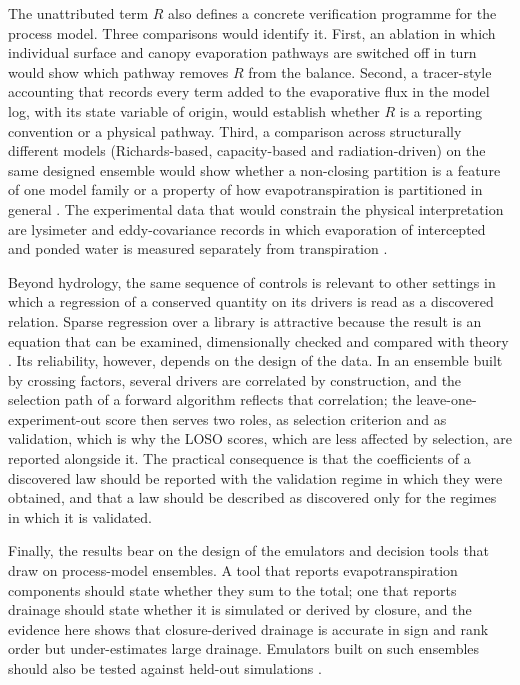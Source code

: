 \documentclass[preprint,12pt,authoryear]{elsarticle}
\begin{document}
The unattributed term $R$ also defines a concrete verification programme for the process model. Three comparisons would identify it. First, an ablation in which individual surface and canopy evaporation pathways are switched off in turn would show which pathway removes $R$ from the balance. Second, a tracer-style accounting that records every term added to the evaporative flux in the model log, with its state variable of origin, would establish whether $R$ is a reporting convention or a physical pathway. Third, a comparison across structurally different models (Richards-based, capacity-based and radiation-driven) on the same designed ensemble would show whether a non-closing partition is a feature of one model family or a property of how evapotranspiration is partitioned in general \citep{Simunek2008,Jones2003,Keating2003,Steduto2009}. The experimental data that would constrain the physical interpretation are lysimeter and eddy-covariance records in which evaporation of intercepted and ponded water is measured separately from transpiration \citep{Good2015,Jasechko2013,Schlesinger2014}.

Beyond hydrology, the same sequence of controls is relevant to other settings in which a regression of a conserved quantity on its drivers is read as a discovered relation. Sparse regression over a library is attractive because the result is an equation that can be examined, dimensionally checked and compared with theory \citep{Brunton2016,Udrescu2020,Champion2019}. Its reliability, however, depends on the design of the data. In an ensemble built by crossing factors, several drivers are correlated by construction, and the selection path of a forward algorithm reflects that correlation; the leave-one-experiment-out score then serves two roles, as selection criterion and as validation, which is why the LOSO scores, which are less affected by selection, are reported alongside it. The practical consequence is that the coefficients of a discovered law should be reported with the validation regime in which they were obtained, and that a law should be described as discovered only for the regimes in which it is validated.

Finally, the results bear on the design of the emulators and decision tools that draw on process-model ensembles. A tool that reports evapotranspiration components should state whether they sum to the total; one that reports drainage should state whether it is simulated or derived by closure, and the evidence here shows that closure-derived drainage is accurate in sign and rank order but under-estimates large drainage. Emulators built on such ensembles should also be tested against held-out simulations \citep{Razavi2012,Asher2015,Wilkinson2016}.
\end{document}
